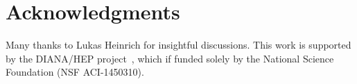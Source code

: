 \section{Acknowledgments}
Many thanks to Lukas Heinrich for insightful discussions.
This work is supported by the DIANA/HEP project~\cite{DIANA-proposal-2014}, which if funded solely by the National Science Foundation (NSF ACI-1450310).

